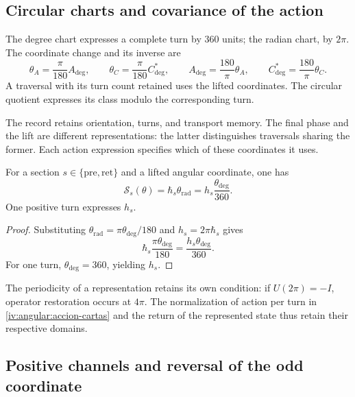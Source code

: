 \subsection{Circular charts and covariance of the action}
\label{iv:angular:cartas}

\begin{definition}
\label{iv:angular:unidades}
The degree chart expresses a complete turn by \(360\)
units; the radian chart, by \(2\pi\). The coordinate
change and its inverse are
\begin{equation}
 \theta_A=\frac{\pi}{180}A_{\deg},\qquad
 \theta_C=\frac{\pi}{180}C^*_{\deg},\qquad
 A_{\deg}=\frac{180}{\pi}\theta_A,\qquad
 C^*_{\deg}=\frac{180}{\pi}\theta_C.
 \label{iv:angular:cambio-carta}
\end{equation}
A traversal with its turn count retained uses the
lifted coordinates. The circular quotient expresses its
class modulo the corresponding turn.
\end{definition}

The record retains orientation, turns, and transport memory.
The final phase and the lift are different representations:
the latter distinguishes traversals sharing the former.
Each action expression specifies which of these coordinates it uses.

\begin{proposition}
\label{iv:angular:accion}
For a section \(s\in\{\mathrm{pre},\mathrm{ret}\}\) and a
lifted angular coordinate, one has
\begin{equation}
 \mathcal S_s(\theta)
 =\hbar_s\theta_{\mathrm{rad}}
 =h_s\frac{\theta_{\deg}}{360}.
 \label{iv:angular:accion-cartas}
\end{equation}
One positive turn expresses \(h_s\).
\end{proposition}
\begin{proof}
Substituting
\(\theta_{\mathrm{rad}}=\pi\theta_{\deg}/180\) and
\(h_s=2\pi\hbar_s\) gives
\[
 \hbar_s\frac{\pi\theta_{\deg}}{180}
 =\frac{h_s\theta_{\deg}}{360}.
\]
For one turn, \(\theta_{\deg}=360\), yielding \(h_s\).
\end{proof}

The periodicity of a representation retains its own
condition: if \(U(2\pi)=-I\), operator restoration occurs
at \(4\pi\). The normalization of action per turn in
\eqref{iv:angular:accion-cartas} and the return of the represented
state thus retain their respective domains.

\subsection{Positive channels and reversal of the odd coordinate}
\label{iv:angular:canales}

